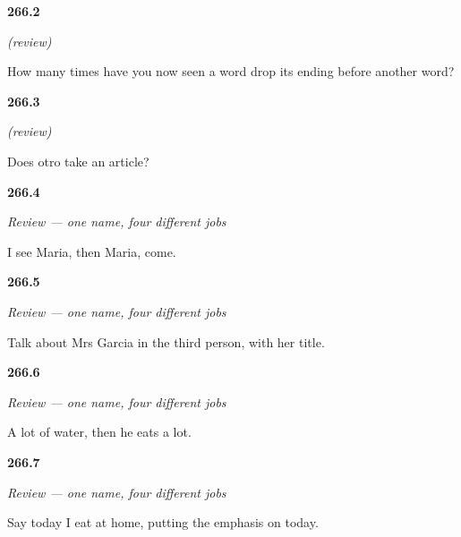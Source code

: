 \noindent\begin{minipage}[t]{\linewidth}
\raggedright
\hypertarget{review-ES-C67-repaso-a1-apocope}{\textbf{266.2}} \emph{(review)}\par
\small How many times have you now seen a word drop its ending before another word?
\end{minipage}\par\medskip

\noindent\begin{minipage}[t]{\linewidth}
\raggedright
\hypertarget{review-ES-C67-repaso-a1-otro}{\textbf{266.3}} \emph{(review)}\par
\small Does otro take an article?
\end{minipage}\par\medskip

\noindent\begin{minipage}[t]{\linewidth}
\raggedright
\hypertarget{review-ES-C67-repaso-lo-que-reemplazo-los-casos-dos}{\textbf{266.4}} \emph{Review — one name, four different jobs}\par
\small I see Maria, then Maria, come.
\end{minipage}\par\medskip

\noindent\begin{minipage}[t]{\linewidth}
\raggedright
\hypertarget{review-ES-C67-repaso-lo-que-reemplazo-los-casos-titulo}{\textbf{266.5}} \emph{Review — one name, four different jobs}\par
\small Talk about Mrs Garcia in the third person, with her title.
\end{minipage}\par\medskip

\noindent\begin{minipage}[t]{\linewidth}
\raggedright
\hypertarget{review-ES-C67-repaso-lo-que-reemplazo-los-casos-cuantificador}{\textbf{266.6}} \emph{Review — one name, four different jobs}\par
\small A lot of water, then he eats a lot.
\end{minipage}\par\medskip

\noindent\begin{minipage}[t]{\linewidth}
\raggedright
\hypertarget{review-ES-C67-repaso-lo-que-reemplazo-los-casos-orden}{\textbf{266.7}} \emph{Review — one name, four different jobs}\par
\small Say today I eat at home, putting the emphasis on today.
\end{minipage}\par\medskip


